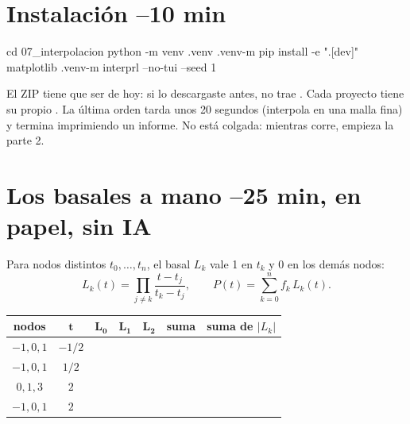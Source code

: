 \section{Instalación \hfill\small{}–10 min}
\begin{orden}
cd 07_interpolacion
python -m venv .venv
.venv\Scripts\python -m pip install -e ".[dev]" matplotlib
.venv\Scripts\python -m interprl --no-tui --seed 1
\end{orden}
El ZIP tiene que ser de hoy: si lo descargaste antes, no trae . Cada proyecto tiene su propio . La última orden tarda unos 20 segundos (interpola en una malla fina) y termina imprimiendo un informe. No está colgada: mientras corre, empieza la parte 2.

\section{Los basales a mano \hfill\small{}–25 min, en papel, sin IA}
Para nodos distintos $t_0,\dots,t_n$, el basal $L_k$ vale 1 en $t_k$ y 0 en los demás nodos:
\[
L_k(t) = \prod_{j\neq k}\frac{t-t_j}{t_k-t_j}, \qquad P(t)=\sum_{k=0}^{n} f_k\,L_k(t).
\]
\begin{preguntas}
\end{preguntas}

\renewcommand{\arraystretch}{1.9}
\begin{tabularx}{\linewidth}{|c|c|X|X|X|X|X|}
\hline
\textbf{nodos} & $\boldsymbol{t}$ & $\boldsymbol{L_0}$ & $\boldsymbol{L_1}$ & $\boldsymbol{L_2}$ & \textbf{suma} & \textbf{suma de $|L_k|$} \\
\hline
$-1, 0, 1$ & $-1/2$ & & & & & \\ \hline
$-1, 0, 1$ & $1/2$ & & & & & \\ \hline
$0, 1, 3$ & $2$ & & & & & \\ \hline
$-1, 0, 1$ & $2$ & & & & & \\ \hline
\end{tabularx}
\renewcommand{\arraystretch}{1.25}

